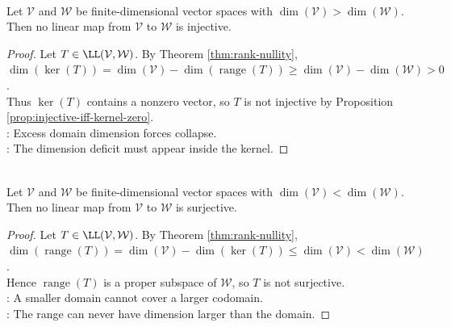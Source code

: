 \begin{corollary} \label{cor:map-to-smaller-space-not-injective} \\
Let $\mathcal{V}$ and $\mathcal{W}$ be finite-dimensional vector spaces with $\dim(\mathcal{V})>\dim(\mathcal{W})$.\\
Then no linear map from $\mathcal{V}$ to $\mathcal{W}$ is injective.
\begin{proof}
Let $T\in\LL(\mathcal{V},\mathcal{W})$. By Theorem \ref{thm:rank-nullity}, $\dim(\ker(T))=\dim(\mathcal{V})-\dim(\operatorname{range}(T)) \geq \dim(\mathcal{V})-\dim(\mathcal{W})>0$.\\
Thus $\ker(T)$ contains a nonzero vector, so $T$ is not injective by Proposition \ref{prop:injective-iff-kernel-zero}.\\
: Excess domain dimension forces collapse.\\
: The dimension deficit must appear inside the kernel.
\end{proof}
\end{corollary}

\begin{corollary} \label{cor:map-to-larger-space-not-surjective} \\
Let $\mathcal{V}$ and $\mathcal{W}$ be finite-dimensional vector spaces with $\dim(\mathcal{V})<\dim(\mathcal{W})$.\\
Then no linear map from $\mathcal{V}$ to $\mathcal{W}$ is surjective.
\begin{proof}
Let $T\in\LL(\mathcal{V},\mathcal{W})$. By Theorem \ref{thm:rank-nullity}, $\dim(\operatorname{range}(T))=\dim(\mathcal{V})-\dim(\ker(T))\leq\dim(\mathcal{V})<\dim(\mathcal{W})$.\\
Hence $\operatorname{range}(T)$ is a proper subspace of $\mathcal{W}$, so $T$ is not surjective.\\
: A smaller domain cannot cover a larger codomain.\\
: The range can never have dimension larger than the domain.
\end{proof}
\end{corollary}

